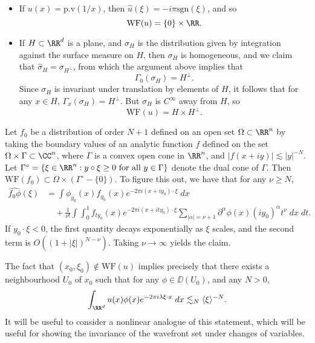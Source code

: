 \begin{example}
\begin{itemize}
    \item If $u(x) = \text{p.v}(1/x)$, then $\widehat{u}(\xi) = -i \pi \text{sgn}(\xi)$, and so
    \[ \text{WF}(u) = \{ 0 \} \times \RR. \]

    \item If $H \subset \RR^d$ is a plane, and $\sigma_H$ is the distribution given by integration against the surface measure on $H$, then $\sigma_H$ is homogeneous, and we claim that $\widehat{\sigma}_H = \sigma_{H^\perp}$, from which the argument above implies that
    \[ \Gamma_0(\sigma_H) = H^\perp. \]
    Since $\sigma_H$ is invariant under translation by elements of $H$, it follows that for any $x \in H$, $\Gamma_x(\sigma_H) = H^\perp$. But $\sigma_H$ is $C^\infty$ away from $H$, so
    \[ \text{WF}(u) = H \times H^\perp. \]
  \end{itemize}
\end{example}

\begin{example}
    Let $f_0$ be a distribution of order $N+1$ defined on an open set $\Omega \subset \RR^n$ by taking the boundary values of an analytic function $f$ defined on the set $\Omega \times \Gamma \subset \CC^n$, where $\Gamma$ is a convex open cone in $\RR^n$, and $|f(x + iy)| \lesssim |y|^{-N}$. Let $\Gamma^\circ = \{ \xi \in \RR^n: y \circ \xi \geq 0\ \text{for all $y \in \Gamma$} \}$ denote the dual cone of $\Gamma$. Then $\text{WF}(f_0) \subset \Omega \times (\Gamma^\circ - \{ 0 \})$. To figure this out, we have that for any $\nu \geq N$,
    \begin{align*}
        \widehat{f_0 \phi}(\xi) &= \int \phi_{y_0}(x) f_{y_0}(x) e^{-2 \pi i (x + i y_0) \cdot \xi}\; dx\\
        &\quad + \frac{1}{\nu!} \int \int_0^1 f_{ty_0}(x) e^{-2 \pi i (x + i ty_0) \cdot \xi} \sum_{|\alpha| = \nu + 1} \partial^\alpha \phi(x) (i y_0)^\alpha t^\nu\; dx\; dt.
    \end{align*}
    If $y_0 \cdot \xi < 0$, the first quantity decays exponentially as $\xi$ scales, and the second term is $O((1 + |\xi|)^{N-\nu})$. Taking $\nu \to \infty$ yields the claim.
\end{example}

The fact that $(x_0,\xi_0) \not \in \text{WF}(u)$ implies precisely that there exists a neighbourhood $U_0$ of $x_0$ such that for any $\phi \in \DD(U_0)$, and any $N > 0$,
%
\[ \int_{\RR^d} u(x) \phi(x) e^{-2 \pi i \lambda \xi \cdot x}\; dx \lesssim_N \langle \xi \rangle^{-N}. \]
%
It will be useful to consider a nonlinear analogue of this statement, which will be useful for showing the invariance of the wavefront set under changes of variables.

